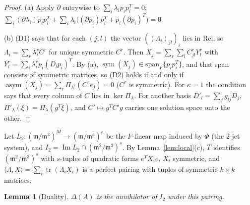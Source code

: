 \documentclass[11pt]{amsart}
\theoremstyle{plain}
\newtheorem{lemma}[theorem]{Lemma}
\theoremstyle{definition}
\begin{document}
\begin{proof}
(a) Apply $\partial$ entrywise to $\sum_i\lambda_ip_ip_i^T=0$:
$\sum_i(\partial\lambda_i)p_ip_i^T+\sum_i\lambda_i\bigl((\partial p_i)p_i^T+p_i(\partial p_i)^T\bigr)=0$.

(b) (D1) says that for each $(j,l)$ the vector $((\Lambda_i)_{jl})_i$ lies in $\mathrm{Rel}$, so
$\Lambda_i=\sum_r\lambda^r_iC^r$ for unique symmetric $C^r$. Then
$X_j=\sum_r\sum_lC^r_{jl}Y^r_l$ with $Y^r_l=\sum_i\lambda^r_ip_i(D_lp_i)^T$. By (a),
$\operatorname{sym}(X_j)\in\mathrm{span}_F\{p_ip_i^T\}$, and that span consists of symmetric matrices, so
(D2) holds if and only if $\operatorname{asym}(X_j)=\sum_r\Pi_{\lambda^r}(C^re_j)=0$ ($C^r$ is symmetric).
For $\kappa=1$ the condition says that every column of $C$ lies in $\ker\Pi_\lambda$. For another basis
$D'_l=\sum_jg_{lj}D_j$, $\Pi'_\lambda(\xi)=\Pi_\lambda(g^T\xi)$, and $C'\mapsto g^TC'g$ carries one
solution space onto the other.
\end{proof}

\noindent Let $L_2:(\mathfrak m/\mathfrak m^3)^M\to(\mathfrak m/\mathfrak m^3)^s$ be the $F$-linear map
induced by $\Phi$ (the 2-jet system), and $I_2=\operatorname{Im}L_2\cap(\mathfrak m^2/\mathfrak m^3)^s$. By
Lemma~\ref{lem:local}(c), $T$ identifies $(\mathfrak m^2/\mathfrak m^3)^s$ with $s$-tuples of quadratic forms
$e^TX_ie$, $X_i$ symmetric, and $\langle\Lambda,X\rangle=\sum_i\operatorname{tr}(\Lambda_iX_i)$ is a
perfect pairing with tuples of symmetric $k\times k$ matrices.

\begin{lemma}[Duality]\label{lem:duality}
$\Delta(A)$ is the annihilator of $I_2$ under this pairing.
\end{lemma}
\end{document}
